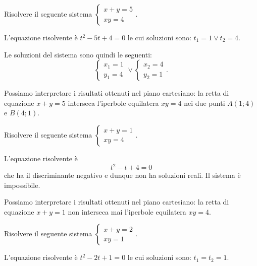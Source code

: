 \begin{exrig}
\begin{esempio}
Risolvere il seguente sistema $\left\{\begin{array}{l}{x+y=5}\\{xy=4}\end{array}\right.$.
\begin{multicols}{2}
L'equazione risolvente è $t^2-5t+4=0$ le cui soluzioni sono: $t_1=1\vee t_2=4$.

Le soluzioni del sistema sono quindi le seguenti: \[ \left\{\begin{array}{l}{x_1=1}\\{y_1=4}\end{array}\right.\vee \left\{\begin{array}{l}{x_2=4}\\{y_2=1}\end{array}\right.. \]

Possiamo interpretare i risultati ottenuti nel piano cartesiano: la retta di equazione $x+y=5$ interseca l'iperbole equilatera ${xy}=4$ nei due punti $A(1;4)$ e $B(4;1)$.
\begin{center}

\end{center}
\end{multicols}
\end{esempio}

\begin{esempio}
Risolvere il seguente sistema $\left\{\begin{array}{l}{x+y=1}\\{xy=4}\end{array}\right.$.
\begin{multicols}{2}
L'equazione risolvente è \[ t^2-t+4=0 \] che ha il discriminante negativo e dunque non ha soluzioni reali. Il sistema è impossibile.

Possiamo interpretare i risultati ottenuti nel piano cartesiano: la retta di equazione $x+y=1$ non interseca mai l'iperbole equilatera ${xy}=4$.
\begin{center}

\end{center}
\end{multicols}
\end{esempio}
\begin{esempio}
Risolvere il seguente sistema $\left\{\begin{array}{l}{x+y=2}\\{xy=1}\end{array}\right.$.
\begin{multicols}{2}
L'equazione risolvente è $t^2-2t+1=0$ le cui soluzioni sono: $t_1=t_2=1$.


\end{multicols}
\end{esempio}
\end{exrig}
